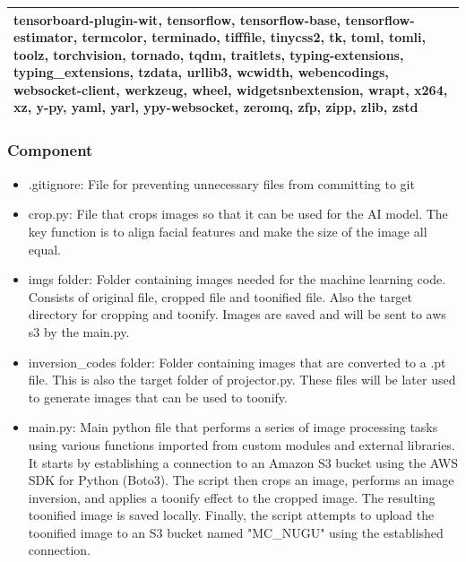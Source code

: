 \documentclass[conference]{IEEEtran}
\begin{document}
\begin{table}[]
\begin{tabular}{|p{7.4cm}|}
tensorboard-plugin-wit, tensorflow, tensorflow-base, tensorflow-estimator, termcolor, terminado, tifffile, tinycss2, tk, toml, tomli, toolz, torchvision, tornado, tqdm, traitlets, typing-extensions, typing\_extensions, tzdata, urllib3, wcwidth, webencodings, websocket-client, werkzeug, wheel, widgetsnbextension, wrapt, x264, xz, y-py, yaml, yarl, ypy-websocket, zeromq, zfp, zipp, zlib, zstd\\
                    \hline
                \end{tabular}
            \end{table}
            
        \subsubsection{Component}
            \begin{itemize}
                \item .gitignore: File for preventing unnecessary files from committing to git\\
                \vspace{3mm}
                \item crop.py: File that crops images so that it can be used for the AI model. The key function is to align facial features and make the size of the image all equal.\\
                \vspace{3mm}
                \item imgs folder: Folder containing images needed for the machine learning code. Consists of original file, cropped file and toonified file. Also the target directory for cropping and toonify. Images are saved and will be sent to aws s3 by the main.py.\\
                \vspace{3mm}
                \item inversion\_codes folder: Folder containing images that are converted to a .pt file. This is also the target folder of projector.py. These files will be later used to generate images that can be used to toonify.\\
                \vspace{3mm}
                \item main.py: Main python file that performs a series of image processing tasks using various functions imported from custom modules and external libraries. It starts by establishing a connection to an Amazon S3 bucket using the AWS SDK for Python (Boto3). The script then crops an image, performs an image inversion, and applies a toonify effect to the cropped image. The resulting toonified image is saved locally. Finally, the script attempts to upload the toonified image to an S3 bucket named "MC\_NUGU" using the established connection.\\

\end{itemize}
\end{document}
